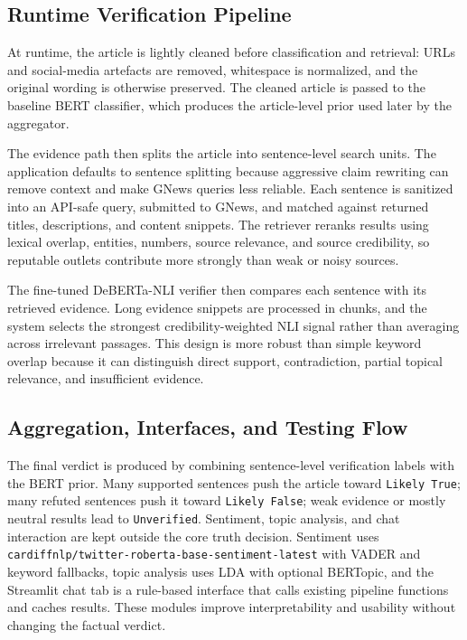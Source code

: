\documentclass[11pt]{article}
\newcommand{\code}[1]{\texttt{#1}}
\begin{document}
\subsection{Runtime Verification Pipeline}

At runtime, the article is lightly cleaned before classification and retrieval:
URLs and social-media artefacts are removed, whitespace is normalized, and the
original wording is otherwise preserved. The cleaned article is passed to the
baseline BERT classifier, which produces the article-level prior used later by
the aggregator.

The evidence path then splits the article into sentence-level search units. The
application defaults to sentence splitting because aggressive claim rewriting
can remove context and make GNews queries less reliable. Each sentence is
sanitized into an API-safe query, submitted to GNews, and matched against
returned titles, descriptions, and content snippets. The retriever reranks
results using lexical overlap, entities, numbers, source relevance, and source
credibility, so reputable outlets contribute more strongly than weak or noisy
sources.

The fine-tuned DeBERTa-NLI verifier then compares each sentence with its
retrieved evidence. Long evidence snippets are processed in chunks, and the
system selects the strongest credibility-weighted NLI signal rather than
averaging across irrelevant passages. This design is more robust than simple
keyword overlap because it can distinguish direct support, contradiction,
partial topical relevance, and insufficient evidence.

\subsection{Aggregation, Interfaces, and Testing Flow}

The final verdict is produced by combining sentence-level verification labels
with the BERT prior. Many supported sentences push the article toward
\code{Likely True}; many refuted sentences push it toward \code{Likely False};
weak evidence or mostly neutral results lead to \code{Unverified}. Sentiment,
topic analysis, and chat interaction are kept outside the core truth decision.
Sentiment uses \code{cardiffnlp/twitter-roberta-base-sentiment-latest} with
VADER and keyword fallbacks, topic analysis uses LDA with optional BERTopic, and
the Streamlit chat tab is a rule-based interface that calls existing pipeline
functions and caches results. These modules improve interpretability and
usability without changing the factual verdict.
\end{document}
